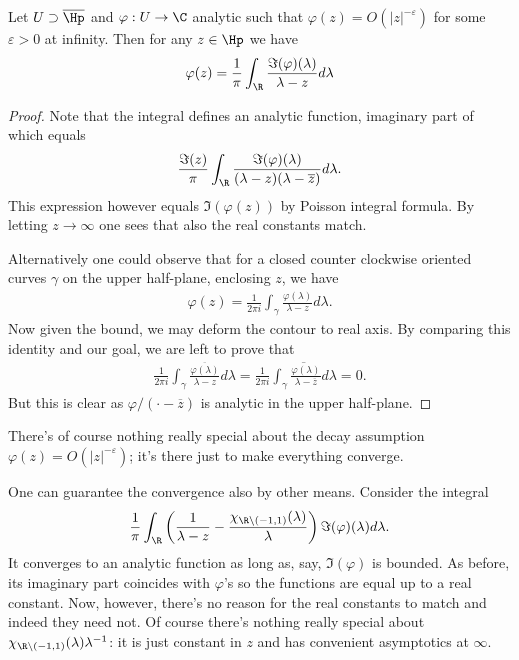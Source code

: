 \begin{lause}
	Let $U \supset \overline{\Hp}$ and $\varphi : U \to \C$ analytic such that $\varphi(z) = O(|z|^{-\varepsilon})$ for some $\varepsilon > 0$ at infinity. Then for any $z \in \Hp$ we have
	\begin{align*}
		\varphi(z) = \frac{1}{\pi}\int_{\R} \frac{\Im(\varphi)(\lambda)}{\lambda - z} d \lambda
	\end{align*}
\end{lause}
\begin{proof}
	Note that the integral defines an analytic function, imaginary part of which equals
	\begin{align*}
		\frac{\Im(z)}{\pi}\int_{\R} \frac{\Im(\varphi)(\lambda)}{(\lambda - z)(\lambda - \overline{z})} d \lambda.
	\end{align*}
	This expression however equals $\Im(\varphi(z))$ by Poisson integral formula. By letting $z \to \infty$ one sees that also the real constants match.

	Alternatively one could observe that for a closed counter clockwise oriented curves $\gamma$ on the upper half-plane, enclosing $z$, we have
	\begin{align*}
		\varphi(z) = \frac{1}{2\pi i}\int_{\gamma} \frac{\varphi(\lambda)}{\lambda - z} d \lambda.
	\end{align*}
	Now given the bound, we may deform the contour to real axis. By comparing this identity and our goal, we are left to prove that
	\begin{align*}
		\frac{1}{2\pi i}\int_{\gamma} \frac{\overline{\varphi(\lambda)}}{\lambda - z} d \lambda = \frac{1}{2\pi i} \overline{\int_{\gamma} \frac{\varphi(\lambda)}{\lambda - \overline{z}} d \lambda} = 0.
	\end{align*}
	But this is clear as $\varphi/(\cdot - \overline{z})$ is analytic in the upper half-plane.
\end{proof}

There's of course nothing really special about the decay assumption $\varphi(z) = O(|z|^{-\varepsilon})$; it's there just to make everything converge.

One can guarantee the convergence also by other means. Consider the integral
\begin{align}\label{easy_pick_repr}
	\frac{1}{\pi}\int_{\R} \left(\frac{1}{\lambda - z} - \frac{\chi_{\R \setminus (-1, 1)}(\lambda)}{\lambda} \right) \Im(\varphi)(\lambda)d \lambda.
\end{align}
It converges to an analytic function as long as, say, $\Im(\varphi)$ is bounded. As before, its imaginary part coincides with $\varphi$'s so the functions are equal up to a real constant. Now, however, there's no reason for the real constants to match and indeed they need not. Of course there's nothing really special about $\chi_{\R \setminus (-1, 1)}(\lambda)\lambda^{-1}$: it is just constant in $z$ and has convenient asymptotics at $\infty$.

